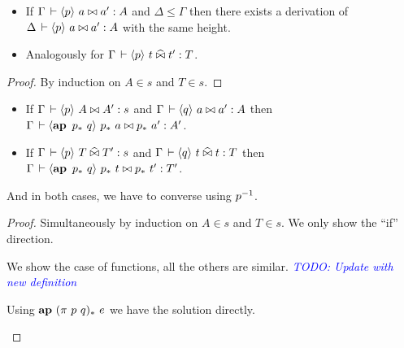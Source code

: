 \documentclass[a4paper,english]{lipics-utf8x}
\newcommand\meta[1]{\noindent\textcolor{blue}{\emph{#1}}}
\begin{document}
  \begin{lemma}[Weakening]
    \leavevmode
    \begin{itemize}
      \item If $\Gamma \,\vdash \langle p \rangle~ a \mathrel{\bowtie} a' : A$ and $\Delta \le \Gamma$ then
      there exists a derivation of $\Delta \,\vdash \langle p \rangle~ a \mathrel{\bowtie} a' : A$ with the
      same height.
      \item Analogously for $\Gamma \,\vdash \langle p \rangle~ t \mathrel{\widehat{\bowtie}} t' : T$.
    \end{itemize}
  \end{lemma}
  \begin{proof}
    By induction on $A \in s$ and $T \in s$.
  \end{proof}

  \begin{lemma}
    \label{lem:s-conv}
    \leavevmode
    \begin{itemize}
      \item If $\Gamma \,\vdash \langle p \rangle~ A \mathrel{\bowtie} A' : s$ and
      $\Gamma \,\vdash \langle q \rangle~ a \mathrel{\bowtie} a' : A$ then
      $\Gamma \der \hideq{\ap p_*\ q} p_*\ a \Er p_*\ a' : A'$.
      \item If $\Gamma \,\vdash \langle p \rangle~ T \mathrel{\widehat{\bowtie}} T' : s$ and
      $\Gamma \,\vdash \langle q \rangle~ t \mathrel{\widehat{\bowtie}} t : T$ then
      $\Gamma \der \hideq{\ap p_*\ q} p_*\ t \Er p_*\ t' : T'$.
    \end{itemize}
    And in both cases, we have to converse using $p^{-1}$.
  \end{lemma}

  \begin{proof}
    Simultaneously by induction on $A \in s$ and $T \in s$.
    We only show the ``if'' direction.

    We show the case of functions, all the others are similar.
    \meta{TODO: Update with new definition}

    \begin{caselist}
      \nextcase
      \begin{mathc}
      \end{mathc}
      \begin{mathc}
      \end{mathc}
      Using $\operatorname{\mathbf{ap}~} (\pi\ p\ q)_*\ e$ we have the solution directly.
    \end{caselist}
  \end{proof}
\end{document}

